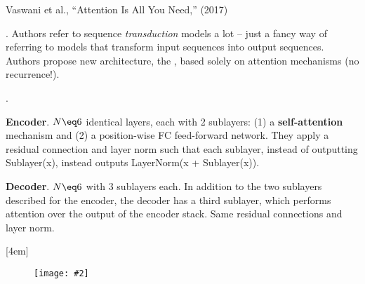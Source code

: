 \documentclass[11pt]{article}
\newcommand\myfig[2][0.3\textwidth]{\begin{figure}[h!]\centering\texttt{[image: \#2]}\end{figure}}
\newcommand\myspace[1][]{\vspace{#1\bigskipamount}}
\newcommand\p{\Needspace{10\baselineskip} \noindent}
\begin{document}
\vspace{-1em}
{\footnotesize Vaswani et al., ``Attention Is All You Need,'' (2017)}

\p {}. Authors refer to sequence \textit{transduction} models a lot -- just a fancy way of referring to models that transform input sequences into output sequences. Authors propose new architecture, the , based solely on attention mechanisms (no recurrence!). 

\myspace
\p {}. 
\begin{compactitem}
	\item \textbf{Encoder}. $N \eq 6$ identical layers, each with 2 sublayers: (1) a  \textbf{self-attention} mechanism and (2) a position-wise FC feed-forward network. They apply a residual connection and layer norm such that each sublayer, instead of outputting Sublayer(x), instead outputs LayerNorm(x + Sublayer(x)).
	
	\item \textbf{Decoder}. $N \eq 6$ with 3 sublayers each. In addition to the two sublayers described for the encoder, the decoder has a third sublayer, which performs  attention over the output of the encoder stack. Same residual connections and layer norm. 
\end{compactitem}[4em]
\myfig[0.4\textwidth]{figs/transformer.png}
\end{document}
